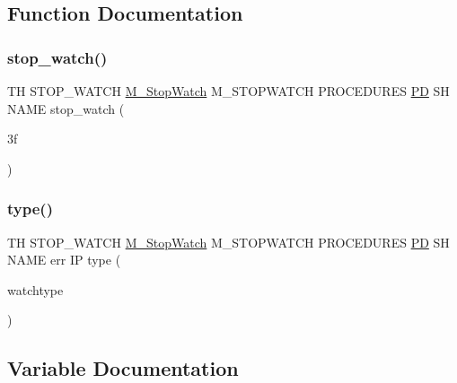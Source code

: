 \subsection{Function Documentation}
\mbox{\label{stop__watch_83_8txt_a6c6e2d89b31d43f474ee6a56e1330368}} 
\subsubsection{\texorpdfstring{stop\+\_\+watch()}{stop\_watch()}}
{\footnotesize\ttfamily TH S\+T\+O\+P\+\_\+\+W\+A\+T\+CH \hyperlink{option__stopwatch_83_8txt_aa2011fc45a5e502e87ee50996a8a9305}{M\+\_\+\+Stop\+Watch} M\+\_\+\+S\+T\+O\+P\+W\+A\+T\+CH P\+R\+O\+C\+E\+D\+U\+R\+ES \hyperlink{what__overview_81_8txt_a85f26da5a4481fbdb0d9c79f2b94de3e}{PD} SH N\+A\+ME stop\+\_\+watch (\begin{DoxyParamCaption}\item[{3f}]{ }\end{DoxyParamCaption})}

\mbox{\label{stop__watch_83_8txt_a70f0ead91c32e25323c03265aa302c1c}} 
\subsubsection{\texorpdfstring{type()}{type()}}
{\footnotesize\ttfamily TH S\+T\+O\+P\+\_\+\+W\+A\+T\+CH \hyperlink{option__stopwatch_83_8txt_aa2011fc45a5e502e87ee50996a8a9305}{M\+\_\+\+Stop\+Watch} M\+\_\+\+S\+T\+O\+P\+W\+A\+T\+CH P\+R\+O\+C\+E\+D\+U\+R\+ES \hyperlink{what__overview_81_8txt_a85f26da5a4481fbdb0d9c79f2b94de3e}{PD} SH N\+A\+ME err IP type (\begin{DoxyParamCaption}\item[{watchtype}]{ }\end{DoxyParamCaption})}



\subsection{Variable Documentation}
\mbox{\label{stop__watch_83_8txt_a148c035b430d6edf5413dbd2704facfb}} 

